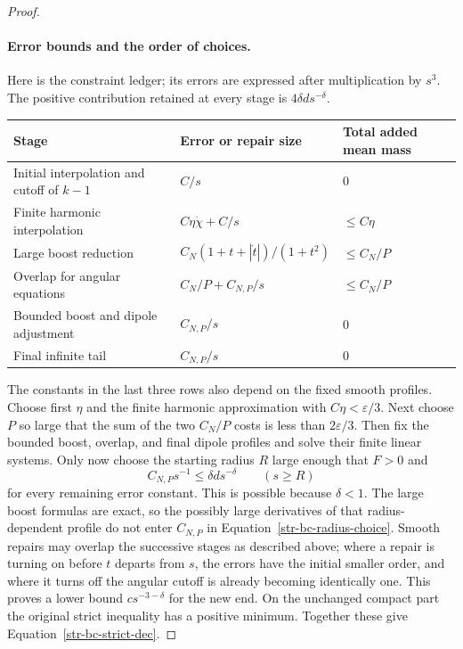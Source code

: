 \begin{proof}
\paragraph{Error bounds and the order of choices.}
Here is the constraint ledger; its errors are expressed after multiplication
by $s^3$. The positive contribution retained at every stage is
$4\delta d s^{-\delta}$.
\begin{center}
\begin{tabular}{lll}
\toprule
Stage & Error or repair size & Total added mean mass\\
\midrule
Initial interpolation and cutoff of $k-1$ & $C/s$ & $0$\\
Finite harmonic interpolation & $C\eta\dot\chi+C/s$ & $\leq C\eta$\\
Large boost reduction & $C_N(1+t+|\dot t|)/(1+t^2)$ & $\leq C_N/P$\\
Overlap for angular equations & $C_N/P+C_{N,P}/s$ & $\leq C_N/P$\\
Bounded boost and dipole adjustment & $C_{N,P}/s$ & $0$\\
Final infinite tail & $C_{N,P}/s$ & $0$\\
\bottomrule
\end{tabular}
\end{center}
The constants in the last three rows also depend on the fixed smooth
profiles. Choose first $\eta$ and the finite harmonic approximation with
$C\eta<\varepsilon/3$. Next choose $P$ so large that the sum of the two
$C_N/P$ costs is less than $2\varepsilon/3$. Then fix the bounded boost,
overlap, and final dipole profiles and solve their finite linear systems.
Only now choose the starting radius $R$ large enough that $F>0$ and
\begin{equation}
 C_{N,P}s^{-1}\leq\delta d s^{-\delta}\qquad(s\geq R)
 \label{str-bc-radius-choice}
\end{equation}
for every remaining error constant. This is possible because $\delta<1$.
The large boost formulas are exact, so the possibly large derivatives of
that radius-dependent profile do not enter $C_{N,P}$ in
Equation~\eqref{str-bc-radius-choice}. Smooth repairs may overlap the
successive stages as described above; where a repair is turning on before
$t$ departs from $s$, the errors have the initial smaller order, and where
it turns off the angular cutoff is already becoming identically one.
This proves a lower bound $c s^{-3-\delta}$ for the new end. On the
unchanged compact part the original strict inequality has a positive
minimum. Together these give Equation~\eqref{str-bc-strict-dec}.


\end{proof}
